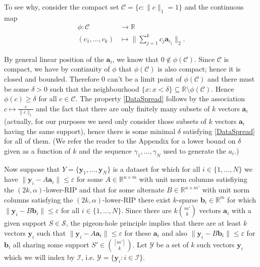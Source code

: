 \documentclass[journal,onecolumn]{IEEEtran}
\begin{document}
To see why, consider the compact set $\mathcal{C} = \{c: \|c\|_1 = 1\}$ and the continuous map
\begin{align*}
\phi: \mathcal{C} &\to \mathbb{R} \\
(c_1, ..., c_k) &\mapsto \|\sum_{j = 1}^k c_j \mathbf{a}_{i_j}\|_2.
\end{align*}

By general linear position of the $\mathbf{a}_i$, we know that $0 \notin \phi(\mathcal{C})$. Since $\mathcal{C}$ is compact, we have by continuity of $\phi$ that $\phi(\mathcal{C})$ is also compact; hence it is closed and bounded. Therefore $0$ can't be a limit point of $\phi(\mathcal{C})$ and there must be some $\delta > 0$ such that the neighbourhood $\{x: x < \delta\} \subseteq \mathbb{R} \setminus \phi(\mathcal{C})$. Hence $\phi(c) \geq \delta$ for all $c \in \mathcal{C}$. The property \eqref{DataSpread} follows by the association $c \mapsto \frac{c}{\|c\|_1}$ and the fact that there are only finitely many subsets of $k$ vectors $\mathbf{a}_i$ (actually, for our purposes we need only consider those subsets of $k$ vectors $\mathbf{a}_i$ having the same support), hence there is some minimal $\delta$ satisfying \eqref{DataSpread} for all of them. (We refer the reader to the Appendix for a lower bound on $\delta$ given as a function of $k$ and the sequence $\gamma_1, \ldots, \gamma_N$ used to generate the $a_i$.)

Now suppose that $Y = \{\mathbf{y}_1, \ldots, \mathbf{y}_N\}$ is a dataset for which for all $i \in \{1, \ldots, N\}$ we have $\|\mathbf{y}_i - A\mathbf{a}_i\| \leq \varepsilon$ for some $A \in \mathbb{R}^{n \times m}$ with unit norm columns satisfiying the $(2k,\alpha)$-lower-RIP and that for some alternate $B \in \mathbb{R}^{n \times m'}$ with unit norm columns satisfying the $(2k,\alpha)$-lower-RIP there exist $k$-sparse $\mathbf{b}_i \in \mathbb{R}^m$ for which $\|\mathbf{y}_i - B\mathbf{b}_i\| \leq \varepsilon$ for all $i \in \{1, \ldots, N\}$. Since there are $k{m' \choose k}$ vectors $\mathbf{a}_i$ with a given support $S \in \mathcal{S}$, the pigeon-hole principle implies that there are at least $k$ vectors $\mathbf{y}_i$ such that $\|\mathbf{y}_i - A\mathbf{a}_i\| \leq \varepsilon$ for these $\mathbf{a}_i$ and also $\|\mathbf{y}_i - B\mathbf{b}_i\| \leq \varepsilon$ for $\mathbf{b}_i$ all sharing some support $S' \in {[m'] \choose k}$. Let $\mathcal{Y}$ be a set of $k$ such vectors $\mathbf{y}_i$ which we will index by $\mathcal{I}$, i.e. $\mathcal{Y} = \{\mathbf{y}_i: i \in \mathcal{I}\}$.
\end{document}
